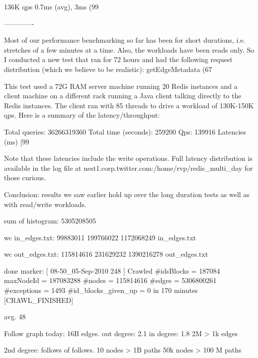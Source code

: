 \documentclass{article}
\begin{document}
136K qps
0.7ms (avg), 3ms (99%

-------------

Most of our performance benchmarking so far has been for short durations, i.e. stretches of a few minutes at a time. Also, the workloads have been reads only. So I conducted a new test that ran for 72 hours and had the following request distribution (which we believe to be realistic): getEdgeMetadata (67%

This test used a 72G RAM server machine running 20 Redis instances and a client machine on a different rack running a Java client talking directly to the Redis instances. The client ran with 85 threads to drive a workload of 130K-150K qps. Here is a summary of the latency/throughput:

Total queries: 36266319360
Total time (seconds): 259200
Qps: 139916
Latencies (ms) [99%

Note that these latencies include the write operations. Full latency distribution is available in the log file at nest1.corp.twitter.com:/home/rvp/redis_multi_day for those curious. 

Conclusion: results we saw earlier hold up over the long duration tests as well as with read/write workloads.

sum of histogram:
5305208505

wc in_edges.txt: 99883011  199766022 1172068249 in_edges.txt

wc out_edges.txt: 115814616  231629232 1390216278 out_edges.txt

done marker:
[ 08-50_05-Sep-2010 248 ] Crawled #idsBlocks = 187084 maxNodeId = 187083288 #nodes = 115814616 #edges = 5306800261 #exceptions = 1493 #id_blocks_given_up = 0 in 170 minutes [CRAWL_FINISHED]

avg. 48

Follow graph today:
16B edges.
out degree: 2.1
in degree: 1.8
2M > 1k edges


2nd degree: follows of follows. 10 nodes > 1B paths
50k nodes > 100 M paths

\end{document}
